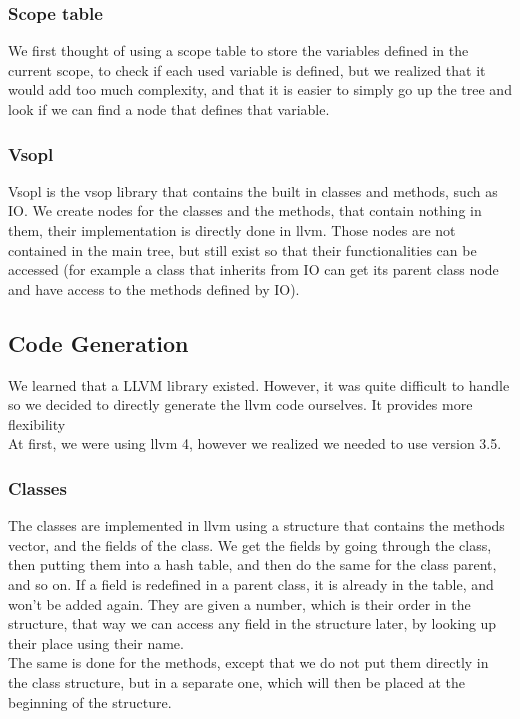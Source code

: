 \documentclass[a4paper,11pt]{article}
\begin{document}
	\subsubsection{Scope table}
	We first thought of using a scope table to store the variables defined in the current scope, to check if each used variable is defined, but we realized that it would add too much complexity, and that it is easier to simply go up the tree and look if we can find a node that defines that variable.
 
  \subsubsection{Vsopl}
  Vsopl is the vsop library that contains the built in classes and methods, such as IO. We create nodes for the classes and the methods, that contain nothing in them, their implementation is directly done in llvm. Those nodes are not contained in the main tree, but still exist so that their functionalities can be accessed (for example a class that inherits from IO can get its parent class node and have access to the methods defined by IO).

\subsection{Code Generation}
  \label{sec:codeGeneration}

  We learned that a LLVM library existed. However, it was quite difficult to handle so we decided to directly generate the llvm code ourselves. It provides more flexibility\\
  At first, we were using llvm 4, however we realized we needed to use version 3.5.

  \subsubsection{Classes}
  The classes are implemented in llvm using a structure that contains the methods vector, and the fields of the class. We get the fields by going through the class, then putting them into a hash table, and then do the same for the class parent, and so on. If a field is redefined in a parent class, it is already in the table, and won't be added again. They are given a number, which is their order in the structure, that way we can access any field in the structure later, by looking up their place using their name.\\
  The same is done for the methods, except that we do not put them directly in the class structure, but in a separate one, which will then be placed at the beginning of the structure.
\end{document}
